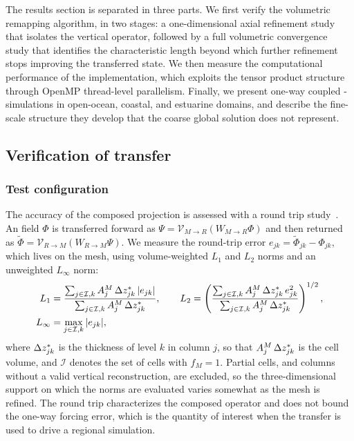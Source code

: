 The results section is separated in three parts. We first verify the volumetric remapping algorithm, in two stages: a one-dimensional axial refinement study that isolates the vertical operator, followed by a full volumetric convergence study that identifies the \ROMS characteristic length beyond which further refinement stops improving the transferred state. We then measure the computational performance of the implementation, which exploits the tensor product structure through OpenMP thread-level parallelism. Finally, we present one-way coupled \MPAS-\ROMS simulations in open-ocean, coastal, and estuarine domains, and describe the fine-scale structure they develop that the coarse global \MPAS solution does not represent.

\subsection{Verification of transfer}\label{conv:sec:results-verification}

\subsubsection{Test configuration}\label{conv:sec:verification-method}
The accuracy of the composed projection is assessed with a round trip study~\citep{mahadevan2022mira}. An \MPAS field $\Phi$ is transferred forward as $\Psi=\mathcal{V}_{M\to R}(W_{M\to R}\Phi)$ and then returned as $\tilde{\Phi}=\mathcal{V}_{R\to M}(W_{R\to M}\Psi)$. We measure the round-trip error $e_{jk}=\tilde{\Phi}_{jk}-\Phi_{jk}$, which lives on the \MPAS mesh, using volume-weighted $L_1$ and $L_2$ norms and an unweighted $L_\infty$ norm:
\begin{align}
  L_1 &= \frac{\sum_{j\in\mathcal{I},k} A^M_j\,\Delta z^{*}_{jk}\,|e_{jk}|}{\sum_{j\in\mathcal{I},k} A^M_j\,\Delta z^{*}_{jk}},\qquad
  L_2 = \left(\frac{\sum_{j\in\mathcal{I},k} A^M_j\,\Delta z^{*}_{jk}\,e_{jk}^2}{\sum_{j\in\mathcal{I},k} A^M_j\,\Delta z^{*}_{jk}}\right)^{1/2},\\
  L_\infty &= \max_{j\in\mathcal{I},k}|e_{jk}|,
  \label{conv:eq:norms}
\end{align}
where $\Delta z^{*}_{jk}$ is the thickness of level $k$ in \MPAS column $j$, so that $A^M_j\,\Delta z^{*}_{jk}$ is the cell volume, and $\mathcal{I}$ denotes the set of \MPAS cells with $f_M=1$. Partial cells, and columns without a valid vertical reconstruction, are excluded, so the three-dimensional support on which the norms are evaluated varies somewhat as the \ROMS mesh is refined. The round trip characterizes the composed operator and does not bound the one-way forcing error, which is the quantity of interest when the transfer is used to drive a regional simulation.

